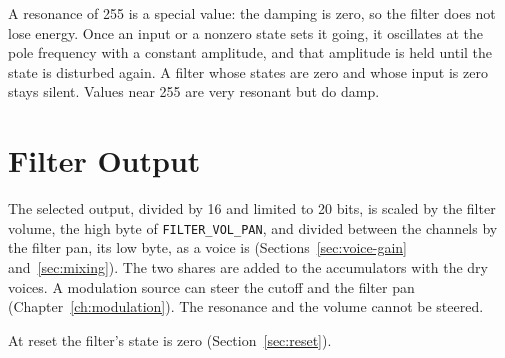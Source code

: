A resonance of 255 is a special value: the damping is zero, so the filter does not lose energy. Once an input or a
nonzero state sets it going, it oscillates at the pole frequency with a constant amplitude, and that amplitude is held
until the state is disturbed again. A filter whose states are zero and whose input is zero stays silent. Values near
255 are very resonant but do damp.

\section{Filter Output}
\label{sec:filter-output}

The selected output, divided by 16 and limited to 20 bits, is scaled by the filter volume, the high byte of
\texttt{FILTER\_VOL\_PAN}, and divided between the channels by the filter pan, its low byte, as a voice is
(Sections~\ref{sec:voice-gain} and~\ref{sec:mixing}). The two shares are added to the accumulators with the dry voices.
A modulation source can steer the cutoff and the filter pan (Chapter~\ref{ch:modulation}). The resonance and the volume
cannot be steered.

At reset the filter's state is zero (Section~\ref{sec:reset}).
